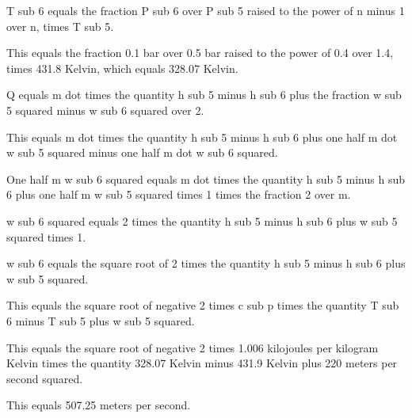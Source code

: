 T sub 6 equals the fraction P sub 6 over P sub 5 raised to the power of n minus 1 over n, times T sub 5.

This equals the fraction 0.1 bar over 0.5 bar raised to the power of 0.4 over 1.4, times 431.8 Kelvin, which equals 328.07 Kelvin.

Q equals m dot times the quantity h sub 5 minus h sub 6 plus the fraction w sub 5 squared minus w sub 6 squared over 2.

This equals m dot times the quantity h sub 5 minus h sub 6 plus one half m dot w sub 5 squared minus one half m dot w sub 6 squared.

One half m w sub 6 squared equals m dot times the quantity h sub 5 minus h sub 6 plus one half m w sub 5 squared times 1 times the fraction 2 over m.

w sub 6 squared equals 2 times the quantity h sub 5 minus h sub 6 plus w sub 5 squared times 1.

w sub 6 equals the square root of 2 times the quantity h sub 5 minus h sub 6 plus w sub 5 squared.

This equals the square root of negative 2 times c sub p times the quantity T sub 6 minus T sub 5 plus w sub 5 squared.

This equals the square root of negative 2 times 1.006 kilojoules per kilogram Kelvin times the quantity 328.07 Kelvin minus 431.9 Kelvin plus 220 meters per second squared.

This equals 507.25 meters per second.